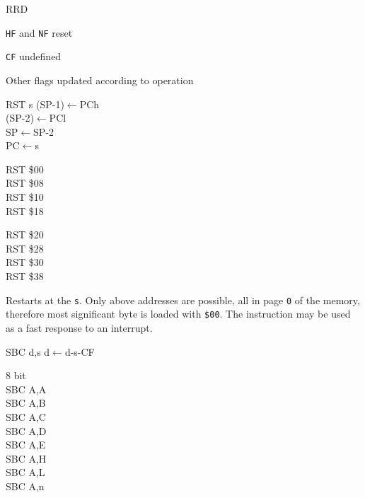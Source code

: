 \documentclass[twoside,openright,a4paper]{book}
\begin{document}
\begin{basedescript}{
	\desclabelstyle{\multilinelabel}
	\desclabelwidth{3cm}}
\begin{detailitem}{RRD}
		\begin{DetailEffects}
			\item {\tt HF} and {\tt NF} reset
			\item {\tt CF} undefined
			\item Other flags updated according to operation
		\end{DetailEffects}
						
		\begin{DetailTiming}
		\end{DetailTiming}

	\end{detailitem}

	\begin{detailitem}{RST s}
		{(SP-1)$\leftarrow$PCh\\
		(SP-2)$\leftarrow$PCl\\
		SP$\leftarrow$SP-2\\
		PC$\leftarrow$s}

		\begin{DetailVariants}
			RST \$00\\
			RST \$08\\
			RST \$10\\
			RST \$18
			
			\columnbreak
			RST \$20\\
			RST \$28\\
			RST \$30\\
			RST \$38
		\end{DetailVariants}

		Restarts at the {\tt s}. Only above addresses are possible, all in page {\tt 0} of the memory, therefore most significant byte is loaded with {\tt \$00}. The instruction may be used as a fast response to an interrupt.

		\DetailNoEffect
						
		\begin{DetailTiming}
			\DetailTime{}{3}{11}
		\end{DetailTiming}

	\end{detailitem}

	\pagebreak
	\begin{detailitem}{SBC d,s}
		{d$\leftarrow$d-s-CF}
	
		\begin{DetailVariants}
			\textnormal{8 bit}\\
			SBC A,A\\
			SBC A,B\\
			SBC A,C\\
			SBC A,D\\
			SBC A,E\\
			SBC A,H\\
			SBC A,L\\
			SBC A,n


\end{DetailVariants}
\end{detailitem}
\end{basedescript}
\end{document}
